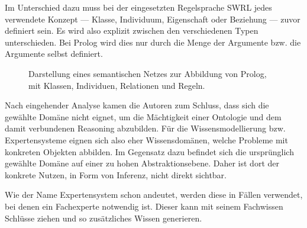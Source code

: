 Im Unterschied dazu muss bei der eingesetzten Regelsprache SWRL jedes verwendete Konzept --- Klasse, Individuum, Eigenschaft oder Beziehung --- zuvor definiert sein. Es wird also explizit zwischen den verschiedenen Typen unterschieden. Bei Prolog wird dies nur durch die Menge der Argumente bzw. die Argumente selbst definiert. 



\begin{figure}[H]
\centering {}
\caption{Darstellung eines semantischen Netzes zur Abbildung von Prolog, mit Klassen, Individuen, Relationen und Regeln.\label{fig:prolog_netz}\protect\footnotemark}
\end{figure}

Nach eingehender Analyse kamen die Autoren zum Schluss, dass sich die gewählte Domäne nicht eignet, um die Mächtigkeit einer Ontologie und dem damit verbundenen Reasoning abzubilden. Für die Wissensmodellierung bzw. Expertensysteme eignen sich also eher Wissensdomänen, welche Probleme mit konkreten Objekten abbilden. Im Gegensatz dazu befindet sich die ursprünglich gewählte Domäne auf einer zu hohen Abstraktionsebene. Daher ist dort der konkrete Nutzen, in Form von Inferenz, nicht direkt sichtbar.

Wie der Name Expertensystem schon andeutet, werden diese in Fällen verwendet, bei denen ein Fachexperte notwendig ist. Dieser kann mit seinem Fachwissen Schlüsse ziehen und so zusätzliches Wissen generieren.

